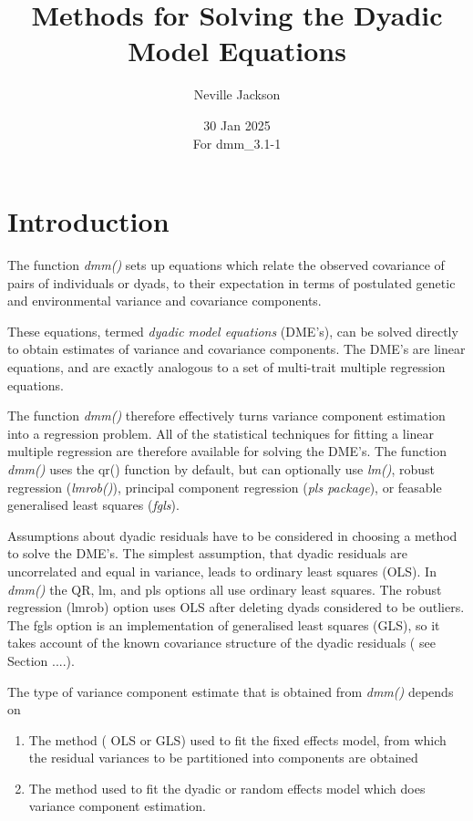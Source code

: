 \documentclass[titlepage,a4paper,12pt]{article}  %
\title{ Methods for Solving the Dyadic Model Equations}
\author{Neville Jackson }
\date{30 Jan 2025 \\
      For dmm\_3.1-1}   %
\begin{document}
 
 
\maketitle      
\tableofcontents

\section{Introduction} 
The function {\em dmm()} sets up equations which relate the observed covariance of pairs of individuals or dyads, to their expectation in terms of postulated genetic and environmental variance and covariance components.

These equations, termed {\em dyadic model equations} (DME's), can be solved directly to obtain estimates of variance and covariance components.  The DME's are linear equations, and are exactly analogous to a set of multi-trait multiple regression equations. 
 
The function {\em dmm()} therefore effectively turns variance component estimation into a regression problem. All of the statistical techniques for fitting a linear multiple regression are therefore available for solving the DME's. The function {\em dmm()} uses the qr() function by default, but can optionally use {\em lm()}, robust regression ({\em lmrob()}),  principal component regression ({\em pls package}), or feasable generalised least squares ({\em fgls}).

Assumptions about dyadic residuals have to be considered in choosing a method to solve the DME's. The simplest assumption, that dyadic residuals are uncorrelated and equal in variance, leads to ordinary least squares (OLS). In {\em dmm()} the QR, lm, and pls options all use ordinary least squares. The robust regression (lmrob) option uses OLS after deleting dyads considered to be outliers.  The fgls option is an implementation of generalised least squares (GLS), so it takes account of the known covariance structure of the dyadic residuals ( see Section ....). 

The type of variance component estimate that is obtained from {\em dmm()} depends on 
\begin{enumerate}
\item The method ( OLS or GLS) used to fit the fixed effects model, from which the residual variances to be partitioned into components are obtained
\item The method used to fit the dyadic or random effects model which does variance component estimation.
\end{enumerate}
\end{document}

